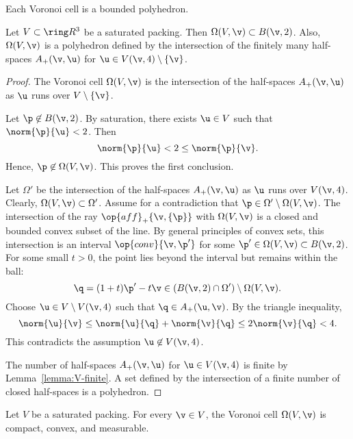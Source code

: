 \begin{cnl}
Each Voronoi cell is a bounded polyhedron.

\begin{lemma}
\label{lemma:Voronoi-polyhedron} 
  Let $V\subset\vecR{3}$ be a saturated packing.  Then
  $\Omega(V,\v)\subset \openBall{\v}{2}$.  Also, $\Omega(V,\v)$ is a polyhedron
  defined by the intersection of the finitely many half-spaces
  $\Aplus(\v,\u)$ for $\u\in \Vee{V}(\v,4)\setminus\braced{\v}$.
\end{lemma}

\begin{proof} 
The Voronoi cell $\Omega(V,\v)$ is the
intersection of the half-spaces $\Aplus(\v,\u)$ as $\u$ runs over
$V\setminus \braced{\v}$.

Let $\p\not\in \openBall{\v}{2}$.  
By saturation, there exists $\u\in V$ such that $\norm{\p}{\u}<2$.
Then 
\[  
\norm{\p}{\u} < 2 \le \norm{\p}{\v}.
\] 
Hence, $\p\not\in\Omega(V,\v)$.  This proves the first conclusion.


Let $\Omega'$ be the intersection of the half-spaces $\Aplus(\v,\u)$ as
$\u$ runs over $\Vee{V}(\v,4)$.  Clearly, $\Omega(V,\v)\subset \Omega'$.
Assume for a contradiction that $\p\in \Omega'\setminus\Omega(V,\v)$.
The intersection of the ray $\op{aff}_+\braced{\v,\{\p\}}$ with
$\Omega(V,\v)$ is a closed and bounded convex subset of the line.  By
general principles of convex sets, this intersection is an interval
$\op{conv}\braced{\v,\p'}$ for some $\p'\in\Omega(V,\v)\subset \openBall{\v}{2}$.
For some small $t>0$, the point lies beyond the interval but remains
within the ball:
\[  
\q = (1+t)\p' -t \v\in (\openBall{\v}{2}\cap \Omega')\setminus \Omega(V,\v).
\] 
Choose $\u\in V\setminus \Vee{V}(\v,4)$ such that $\q\in \Aplus(\u,\v)$.  By the
triangle inequality,
\[  
\norm{\u}{\v} \le \norm{\u}{\q} + \norm{\v}{\q} \le 2\norm{\v}{\q} < 4.
\] 
This contradicts the assumption $\u\not\in \Vee{V}(\v,4)$.

The number of half-spaces $\Aplus(\v,\u)$ for $\u\in \Vee{V}(\v,4)$ is finite by
Lemma~\ref{lemma:V-finite}.  A set defined by the intersection of a finite number
of closed half-spaces is a polyhedron.
\end{proof}

\begin{lemma}
\label{lemma:Voronoi-compact}
Let $ V$ be a saturated packing.  For every $\v\in  V$, 
the Voronoi cell $\Omega( V,\v)$  is
compact, convex, and measurable.
\end{lemma}


\end{cnl}
